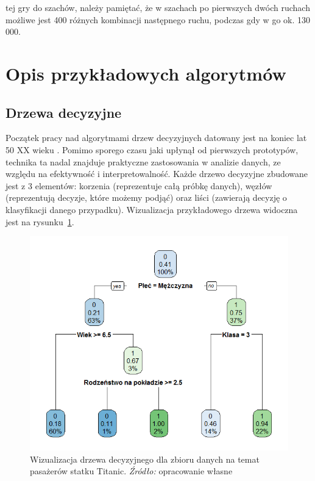 \documentclass[12pt,a4paper,twoside,openany]{book}
\begin{document}
tej gry do szachów, należy pamiętać, że w szachach po pierwszych dwóch ruchach możliwe jest 400 różnych kombinacji następnego ruchu, podczas gdy w go ok. 130 000. 


\section{Opis przykładowych algorytmów}

\subsection{Drzewa decyzyjne}

Początek pracy nad algorytmami drzew decyzyjnych datowany jest na koniec lat 50 XX wieku \citep{belson1959}. Pomimo sporego czasu jaki upłynął od pierwszych prototypów, technika ta nadal znajduje praktyczne zastosowania w analizie danych, ze względu na efektywność i interpretowalność. 
Każde drzewo decyzyjne zbudowane jest z 3 elementów: korzenia (reprezentuje całą próbkę danych), węzłów (reprezentują decyzje, które możemy podjąć) oraz liści (zawierają decyzję o klasyfikacji danego przypadku). Wizualizacja przykładowego drzewa widoczna jest na rysunku~\ref{rys001}.

\begin{figure}
\centering
\includegraphics[scale=0.8]{./rys001}

\caption{Wizualizacja drzewa decyzyjnego dla zbioru danych na temat pasażerów statku Titanic. \textit{Źródło:} opracowanie własne}\label{rys001}
\end{figure}
\end{document}
